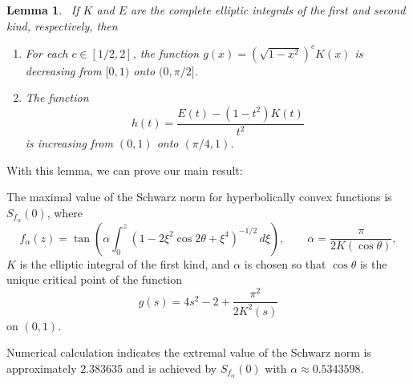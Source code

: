 \documentclass{lms}
\newtheorem{lemma}[theorem]{Lemma}
\numberwithin{equation}{section}
\begin{document}
\begin{lemma}~\label{L:matti}
If $K$ and $E$ are the complete elliptic integrals of the first and 
second kind, respectively, then
\begin{enumerate}
\item For each $c\in[1/2,2]$, the function $g(x)=(\sqrt{1-x^2})^c K(x)$
is decreasing from $[0,1)$ onto $(0,\pi/2]$.
\item The function 
\[
h(t)=\frac{E(t)-(1-t^2)K(t)}{t^2}
\]
is increasing from $(0,1)$ onto $(\pi/4,1)$.
\end{enumerate}
\end{lemma}

With this lemma, we can prove our main result:

\begin{thm*}
The maximal value of the Schwarz norm for hyperbolically convex
functions is $S_{f_\alpha}(0)$, where
\[
f_\alpha(z) =\tan\left( \alpha\int_0^z \left(1-2\xi^2\cos 2\theta+\xi^4
\right)^{-1/2}\,d\xi \right),  \qquad \alpha  = \frac{\pi}{2K(\cos \theta)},
\]
$K$ is the elliptic integral of the first kind, and $\alpha$ is chosen
so that $\cos \theta$ is the unique critical point of the function
\[
g(s) = 4s^2-2 +\frac{\pi^2}{2K^2(s)}
\]
on $(0,1)$.
\end{thm*}


Numerical calculation indicates the extremal value of the 
Schwarz norm is approximately $2.383635$ and is achieved by
$S_{f_\alpha}(0)$ with $\alpha\approx 0.5343598$.
\end{document}
